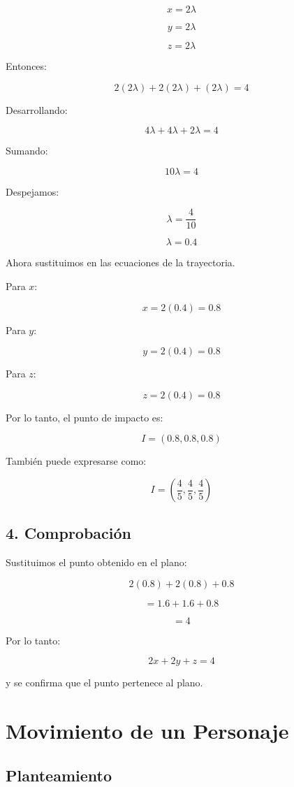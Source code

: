 \documentclass[12pt,a4paper]{article}
\begin{document}
\[x=2\lambda\]

\[y=2\lambda\]

\[z=2\lambda\]

Entonces:

\[2(2\lambda)+2(2\lambda)+(2\lambda)=4\]

Desarrollando:

\[4\lambda+4\lambda+2\lambda=4\]

Sumando:

\[10\lambda=4\]

Despejamos:

\[\lambda=\frac{4}{10}\]

\[\boxed{\lambda=0.4}\]

Ahora sustituimos en las ecuaciones de la trayectoria.

Para $x$:

\[x=2(0.4)=0.8\]

Para $y$:

\[y=2(0.4)=0.8\]

Para $z$:

\[z=2(0.4)=0.8\]

Por lo tanto, el punto de impacto es:

\[\boxed{I=(0.8,0.8,0.8)}\]

También puede expresarse como:

\[\boxed{I=\left(\frac45,\frac45,\frac45\right)}\]

\subsection{4. Comprobación}

Sustituimos el punto obtenido en el plano:

\[2(0.8)+2(0.8)+0.8\]

\[=1.6+1.6+0.8\]

\[=4\]

Por lo tanto:

\[\boxed{2x+2y+z=4}\]

y se confirma que el punto pertenece al plano.


\section{Movimiento de un Personaje}

\subsection{Planteamiento}
\end{document}

